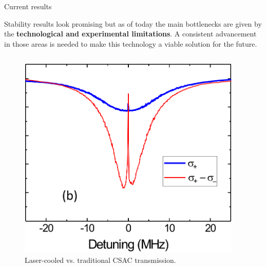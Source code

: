 \begin{frame}{Current results}

    Stability results look promising but as of today the main bottlenecks are given by the \textbf{technological and experimental limitations}.
    A consistent advancement in those areas is needed to make this technology a viable solution for the future.

    \begin{columns}[T, onlytextwidth]

        \begin{column}{0.5\textwidth}

            \begin{figure}
                \centering
                \includegraphics[height=0.45\textheight]{img/laser-cooled-alkali-metals-trasmission.png}
                \caption{\textcolor[HTML]{CA0200}{Laser-cooled} vs. \textcolor[HTML]{3700A7}{traditional} CSAC transmission.}
            \end{figure}

        \end{column}

        \begin{column}{0.5\textwidth}


\end{column}
\end{columns}
\end{frame}

